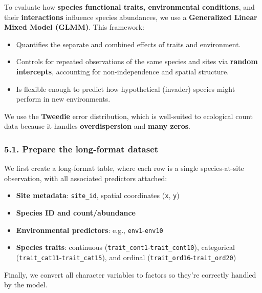 \documentclass[
]{article}
\providecommand{\tightlist}{%
  \setlength{\itemsep}{0pt}\setlength{\parskip}{0pt}}
\begin{document}
To evaluate how \textbf{species functional traits, environmental
conditions}, and their \textbf{interactions} influence species
abundances, we use a \textbf{Generalized Linear Mixed Model (GLMM)}.
This framework:

\begin{itemize}
\tightlist
\item
  Quantifies the separate and combined effects of traits and
  environment.
\item
  Controls for repeated observations of the same species and sites via
  \textbf{random intercepts}, accounting for non-independence and
  spatial structure.
\item
  Is flexible enough to predict how hypothetical (invader) species might
  perform in new environments.
\end{itemize}

We use the \textbf{Tweedie} error distribution, which is well-suited to
ecological count data because it handles \textbf{overdispersion} and
\textbf{many zeros}.

\hypertarget{prepare-the-long-format-dataset}{%
\subsubsection{5.1. Prepare the long-format
dataset}\label{prepare-the-long-format-dataset}}

We first create a long-format table, where each row is a single
species-at-site observation, with all associated predictors attached:

\begin{itemize}
\tightlist
\item
  \textbf{Site metadata}: \texttt{site\_id}, spatial coordinates
  (\texttt{x}, \texttt{y})
\item
  \textbf{Species ID and count/abundance}
\item
  \textbf{Environmental predictors}: e.g., \texttt{env1}-\texttt{env10}
\item
  \textbf{Species traits}: continuous
  (\texttt{trait\_cont1}-\texttt{trait\_cont10}), categorical
  (\texttt{trait\_cat11}-\texttt{trait\_cat15}), and ordinal
  (\texttt{trait\_ord16}-\texttt{trait\_ord20})
\end{itemize}

Finally, we convert all character variables to factors so they're
correctly handled by the model.
\end{document}

